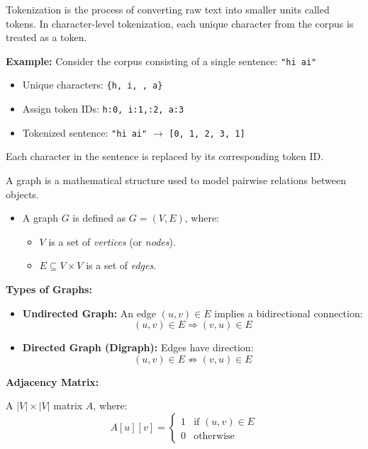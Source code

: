 \documentclass{article}
\begin{document}

Tokenization is the process of converting raw text into smaller units called tokens. In character-level tokenization, each unique character from the corpus is treated as a token.

\textbf{Example:} Consider the corpus consisting of a single sentence:  
\texttt{"hi ai"}

\begin{itemize}
    \item Unique characters: \texttt{\{h, i, \space, a\}}  
    \item Assign token IDs: \texttt{h:0,\ i:1,\space:2,\ a:3}
    \item Tokenized sentence: \texttt{"hi ai"} $\rightarrow$ \texttt{[0, 1, 2, 3, 1]}
\end{itemize}

Each character in the sentence is replaced by its corresponding token ID.


A graph is a mathematical structure used to model pairwise relations between objects.

\begin{itemize}
    \item A graph \( G \) is defined as \( G = (V, E) \), where:
    \begin{itemize}
        \item \( V \) is a set of \textit{vertices} (or \textit{nodes}).
        \item \( E \subseteq V \times V \) is a set of \textit{edges}.
    \end{itemize}
\end{itemize}

\textbf{Types of Graphs:}
\begin{itemize}
    \item \textbf{Undirected Graph:}  
    An edge \( (u, v) \in E \) implies a bidirectional connection:  
    \[
    (u, v) \in E \Rightarrow (v, u) \in E
    \]

    \item \textbf{Directed Graph (Digraph):}  
    Edges have direction:  
    \[
    (u, v) \in E \not\Rightarrow (v, u) \in E
    \]
\end{itemize}


\textbf{Adjacency Matrix:}

A \( |V| \times |V| \) matrix \( A \), where:
\[
A[u][v] = 
\begin{cases}
1 & \text{if } (u,v) \in E \\
0 & \text{otherwise}
\end{cases}
\]
\end{document}
